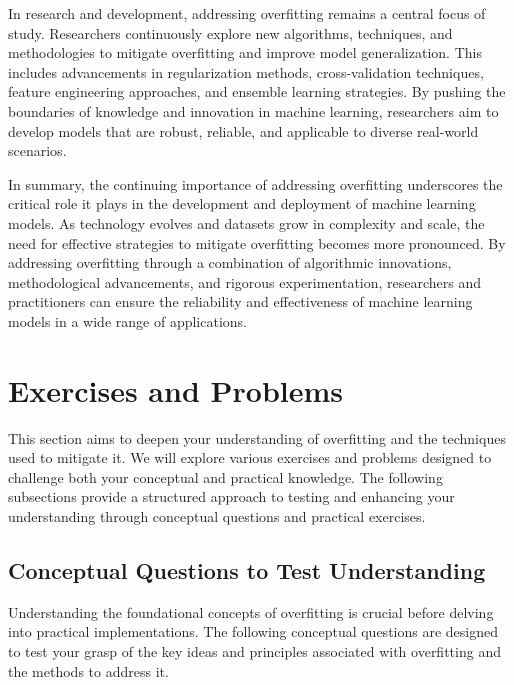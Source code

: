 \documentclass[12pt]{book} %
\begin{document}
In research and development, addressing overfitting remains a central focus of study. Researchers continuously explore new algorithms, techniques, and methodologies to mitigate overfitting and improve model generalization. This includes advancements in regularization methods, cross-validation techniques, feature engineering approaches, and ensemble learning strategies. By pushing the boundaries of knowledge and innovation in machine learning, researchers aim to develop models that are robust, reliable, and applicable to diverse real-world scenarios.

In summary, the continuing importance of addressing overfitting underscores the critical role it plays in the development and deployment of machine learning models. As technology evolves and datasets grow in complexity and scale, the need for effective strategies to mitigate overfitting becomes more pronounced. By addressing overfitting through a combination of algorithmic innovations, methodological advancements, and rigorous experimentation, researchers and practitioners can ensure the reliability and effectiveness of machine learning models in a wide range of applications.

\section{Exercises and Problems}
This section aims to deepen your understanding of overfitting and the techniques used to mitigate it. We will explore various exercises and problems designed to challenge both your conceptual and practical knowledge. The following subsections provide a structured approach to testing and enhancing your understanding through conceptual questions and practical exercises.

\subsection{Conceptual Questions to Test Understanding}
Understanding the foundational concepts of overfitting is crucial before delving into practical implementations. The following conceptual questions are designed to test your grasp of the key ideas and principles associated with overfitting and the methods to address it.
\end{document}
